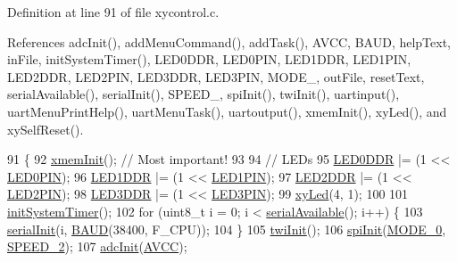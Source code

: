 Definition at line 91 of file xycontrol.\-c.



References adc\-Init(), add\-Menu\-Command(), add\-Task(), A\-V\-C\-C, B\-A\-U\-D, help\-Text, in\-File, init\-System\-Timer(), L\-E\-D0\-D\-D\-R, L\-E\-D0\-P\-I\-N, L\-E\-D1\-D\-D\-R, L\-E\-D1\-P\-I\-N, L\-E\-D2\-D\-D\-R, L\-E\-D2\-P\-I\-N, L\-E\-D3\-D\-D\-R, L\-E\-D3\-P\-I\-N, M\-O\-D\-E\-\_, out\-File, reset\-Text, serial\-Available(), serial\-Init(), S\-P\-E\-E\-D\-\_, spi\-Init(), twi\-Init(), uartinput(), uart\-Menu\-Print\-Help(), uart\-Menu\-Task(), uartoutput(), xmem\-Init(), xy\-Led(), and xy\-Self\-Reset().


\begin{DoxyCode}
91                   \{
92     \hyperlink{group__xmem_ga9744de3b2aca21a564b151e770ed7384}{xmemInit}(); \textcolor{comment}{// Most important!}
93 
94     \textcolor{comment}{// LEDs}
95     \hyperlink{group__config_ga86208659221ec2a932cd722dfc18101f}{LED0DDR} |= (1 << \hyperlink{group__config_gab0e1f692e2b1fa1cdbb24a9926b3489d}{LED0PIN});
96     \hyperlink{group__config_gab0f33b52cdb68e643eba6cf583fb625f}{LED1DDR} |= (1 << \hyperlink{group__config_ga04d7aaffbb7b5afaf49acf8a3a39e33a}{LED1PIN});
97     \hyperlink{group__config_ga7e635626ee31b094da0a668476132577}{LED2DDR} |= (1 << \hyperlink{group__config_ga50070e632cb68d11f627c5ab60f88683}{LED2PIN});
98     \hyperlink{group__config_ga09535652dd0ca340b20840c848cb6093}{LED3DDR} |= (1 << \hyperlink{group__config_ga2663b8fc01c4753562adc572cf12a5ed}{LED3PIN});
99     \hyperlink{group__xycontrol_ga783aead7f97dd462a9af56b7fc3b228f}{xyLed}(4, 1);
100 
101     \hyperlink{group__time_ga66bac2517b216a802f8fb2233eccfa66}{initSystemTimer}();
102     \textcolor{keywordflow}{for} (uint8\_t i = 0; i < \hyperlink{group__uart_ga1ea963b291215ad9c5e8a0610f116b90}{serialAvailable}(); i++) \{
103         \hyperlink{group__uart_ga73d4335cb201753c580c87954f493886}{serialInit}(i, \hyperlink{group__uart_gafccfd7d1315f0763ac404c6104883341}{BAUD}(38400, F\_CPU));
104     \}
105     \hyperlink{group__twi_ga1a9c88673ee82a5a84274814f168ea78}{twiInit}();
106     \hyperlink{group__spi_gab16bbe73b15109ae6ca700391711d036}{spiInit}(\hyperlink{group__spi_ggae506139af46f1328f631ddacd54af96da68ae6cc4ed3f27fe8040eb93d9c4efa3}{MODE\_0}, \hyperlink{group__spi_gga92b13fd51af2a9a09b1854520a5a427fa3e1a04cc2aad70558b57122e6b70f8b6}{SPEED\_2});
107     \hyperlink{group__adc_ga658c8b976878603187b79166345319e0}{adcInit}(\hyperlink{group__adc_gga7fc3dc0de11790b4393b4be70d79a02faead1f65bef727ff7542b8139baceae9c}{AVCC});

\end{DoxyCode}
